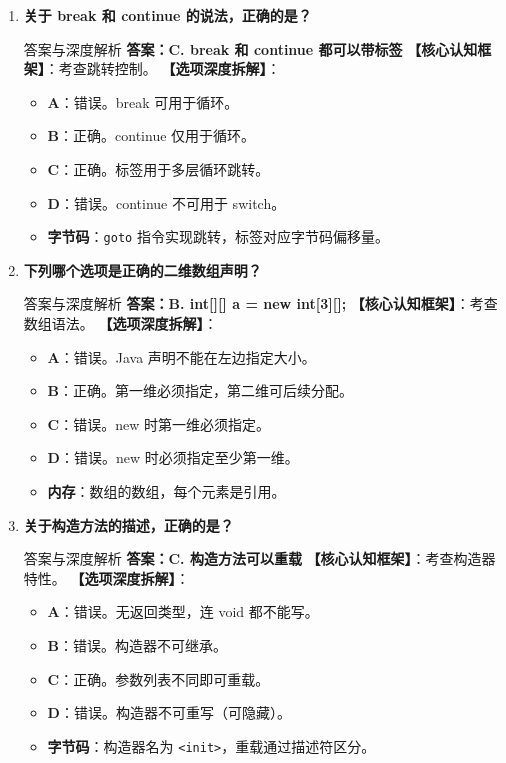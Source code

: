 \documentclass[12pt, a4paper]{ctexart}
\newcommand{\code}[1]{\texttt{\color{myblue}#1}}
\begin{document}
\begin{enumerate}[label=\arabic*.]
\item \textbf{关于 break 和 continue 的说法，正确的是？}
\begin{bluebox}{答案与深度解析}
\textbf{答案：C. break 和 continue 都可以带标签}
\textbf{【核心认知框架】}：考查跳转控制。
\textbf{【选项深度拆解】}：
\begin{itemize}[leftmargin=*, nosep]
    \item \textbf{A}：错误。break 可用于循环。
    \item \textbf{B}：正确。continue 仅用于循环。
    \item \textbf{C}：正确。标签用于多层循环跳转。
    \item \textbf{D}：错误。continue 不可用于 switch。
    \item \textbf{字节码}：\code{goto} 指令实现跳转，标签对应字节码偏移量。
\end{itemize}
\end{bluebox}

\item \textbf{下列哪个选项是正确的二维数组声明？}
\begin{bluebox}{答案与深度解析}
\textbf{答案：B. int[][] a = new int[3][];}
\textbf{【核心认知框架】}：考查数组语法。
\textbf{【选项深度拆解】}：
\begin{itemize}[leftmargin=*, nosep]
    \item \textbf{A}：错误。Java 声明不能在左边指定大小。
    \item \textbf{B}：正确。第一维必须指定，第二维可后续分配。
    \item \textbf{C}：错误。new 时第一维必须指定。
    \item \textbf{D}：错误。new 时必须指定至少第一维。
    \item \textbf{内存}：数组的数组，每个元素是引用。
\end{itemize}
\end{bluebox}

\item \textbf{关于构造方法的描述，正确的是？}
\begin{bluebox}{答案与深度解析}
\textbf{答案：C. 构造方法可以重载}
\textbf{【核心认知框架】}：考查构造器特性。
\textbf{【选项深度拆解】}：
\begin{itemize}[leftmargin=*, nosep]
    \item \textbf{A}：错误。无返回类型，连 void 都不能写。
    \item \textbf{B}：错误。构造器不可继承。
    \item \textbf{C}：正确。参数列表不同即可重载。
    \item \textbf{D}：错误。构造器不可重写（可隐藏）。
    \item \textbf{字节码}：构造器名为 \code{<init>}，重载通过描述符区分。
\end{itemize}
\end{bluebox}


\end{enumerate}
\end{document}
